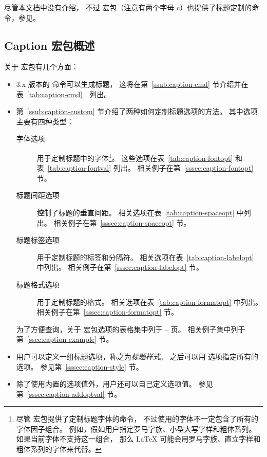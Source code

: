 尽管本文档中没有介绍，
不过  宏包（注意有两个字母 c）也提供了标题定制的命令，参见\cite{ccaption-doc}。

\subsection{Caption 宏包概述}\label{ssec:caption-overview}

关于  宏包有几个方面：
\begin{itemize}
	\item 3.x 版本的  命令可以生成标题，
	这将在第~\ref{ssub:caption-cmd} 节介绍并在表~\ref{tab:caption-cmd}　列出。
	
	\item 第~\ref{ssub:caption-custom} 节介绍了两种如何定制标题选项的方法。
	其中选项主要有四种类型：
	\begin{description}
		\item[字体选项] 用于定制标题中的字体\footnote{%
			尽管  宏包提供了定制标题字体的命令，
			不过使用的字体不一定包含了所有的字体因子组合。
			例如，假如用户指定罗马字族、小型大写字样和粗体系列。
			如果当前字体不支持这一组合，
			那么 \LaTeX{} 可能会用罗马字族、直立字样和粗体系列的字体来代替。}。
		这些选项在表~\ref{tab:caption-fontopt} 和表~\ref{tab:caption-fontval} 列出。
		相关例子在第~\ref{sssec:caption-fontopt} 节。
		
		\item[标题间距选项] 控制了标题的垂直间距。
		相关选项在表~\ref{tab:caption-spaceopt} 中列出。
		相关例子在第~\ref{sssec:caption-spaceopt} 节。
		
		\item[标题标签选项] 用于定制标题的标签和分隔符。
		相关选项在表~\ref{tab:caption-labelopt} 中列出。
		相关例子在第~\ref{sssec:caption-labelopt} 节。
		
		\item[标题格式选项] 用于定制标题的格式。
		相关选项在表~\ref{tab:caption-formatopt} 中列出。
		相关例子在第~\ref{sssec:caption-formatopt} 节。
	\end{description}
	为了方便查询，关于  宏包选项的表格集中列于 \pageref{tab:caption-fontopt}--\pageref{tab:caption-formatopt} 页。
	相关例子集中列于第~\ref{ssec:caption-example} 节。
	
	\item 用户可以定义一组标题选项，称之为\emph{标题样式}。
	之后可以用  选项指定所有的选项。
	参见第~\ref{sssec:caption-style} 节。
	
	\item 除了使用内置的选项值外，用户还可以自己定义选项值。
	参见第~\ref{sssec:caption-addoptval} 节。
\end{itemize}


